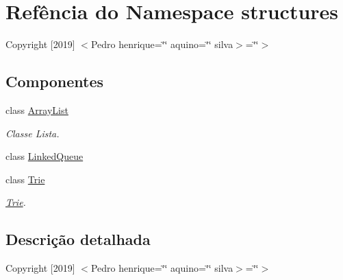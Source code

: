 \hypertarget{namespacestructures}{}\section{Refência do Namespace structures}
\label{namespacestructures}


Copyright \mbox{[}2019\mbox{]} $<$\+Pedro henrique=\char`\"{}\char`\"{} aquino=\char`\"{}\char`\"{} silva$>$=\char`\"{}\char`\"{}$>$  


\subsection*{Componentes}
\begin{DoxyCompactItemize}
\item 
class \mbox{\hyperlink{classstructures_1_1ArrayList}{Array\+List}}
\begin{DoxyCompactList}\small\item\em Classe Lista. \end{DoxyCompactList}\item 
class \mbox{\hyperlink{classstructures_1_1LinkedQueue}{Linked\+Queue}}
\item 
class \mbox{\hyperlink{classstructures_1_1Trie}{Trie}}
\begin{DoxyCompactList}\small\item\em \mbox{\hyperlink{classstructures_1_1Trie}{Trie}}. \end{DoxyCompactList}\end{DoxyCompactItemize}


\subsection{Descrição detalhada}
Copyright \mbox{[}2019\mbox{]} $<$\+Pedro henrique=\char`\"{}\char`\"{} aquino=\char`\"{}\char`\"{} silva$>$=\char`\"{}\char`\"{}$>$ 
